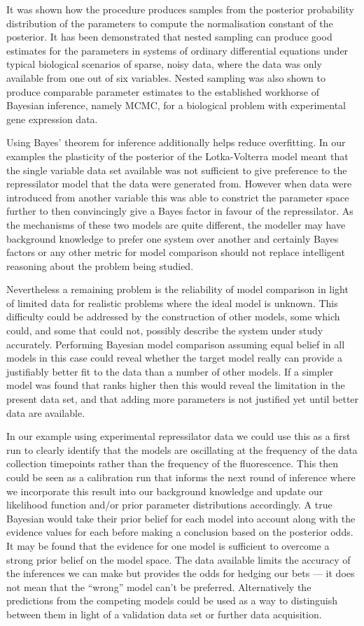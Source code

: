 It was shown how the procedure produces samples from the posterior probability distribution of the parameters to compute the normalisation constant of the posterior.
It has been demonstrated that nested sampling can produce good estimates for the parameters in systems of ordinary differential equations under typical biological scenarios of sparse, noisy data, where the data was only available from one out of six variables.
Nested sampling was also shown to produce comparable parameter estimates to the established workhorse of Bayesian inference, namely MCMC, for a biological problem with experimental gene expression data.

Using Bayes' theorem for inference additionally helps reduce overfitting. 
In our examples the plasticity of the posterior of the Lotka-Volterra model meant that the single variable data set available was not sufficient to give preference to the repressilator model that the data were generated from.
However when data were introduced from another variable this was able to constrict the parameter space further to then convincingly give a Bayes factor in favour of the repressilator. 
As the mechanisms of these two models are quite different, the modeller may have background knowledge to prefer one system over another and certainly Bayes factors or any other metric for model comparison should not replace intelligent reasoning about the problem being studied.

Nevertheless a remaining problem is the reliability of model comparison in light of limited data for realistic problems where the ideal model is unknown.
This difficulty could be addressed by the construction of other models, some which could, and some that could not, possibly describe the system under study accurately.
Performing Bayesian model comparison assuming equal belief in all models in this case could reveal whether the target model really can provide a justifiably better fit to the data than a number of other models.
If a simpler model was found that ranks higher then this would reveal the limitation in the present data set, and that adding more parameters is not justified yet until better data are available.

In our example using experimental repressilator data we could use this as a first run to clearly identify that the models are oscillating at the frequency of the data collection timepoints rather than the frequency of the fluorescence.
This then could be seen as a calibration run that informs the next round of inference where we incorporate this result into our background knowledge and update our likelihood function and/or prior parameter distributions accordingly.
A true Bayesian would take their prior belief for each model into account along with the evidence values for each before making a conclusion based on the posterior odds.
It may be found that the evidence for one model is sufficient to overcome a strong prior belief on the model space.
The data available limits the accuracy of the inferences we can make but provides the odds for hedging our bets --- it does not mean that the ``wrong'' model can't be preferred.
Alternatively the predictions from the competing models could be used as a way to distinguish between them in light of a validation data set or further data acquisition.

